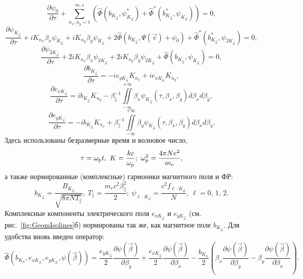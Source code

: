 \begin{equation}
\label{eq14_ch5}
    \dfrac{\partial \psi_0}{\partial \tau} 
    + \sum\limits^{m,s}_{n_x,n_y=1}\left( \hat \Phi(b_{K_{\vec{n}}},\psi_{K_{\vec{n}}}^*) 
    + \hat \Phi^*(b_{K_{\vec{n}}}^*,\psi_{K_{\vec{n}}}) \right)=0,
\end{equation}
\begin{equation}
    \dfrac{\partial \psi_{K_{\vec{n}}}}{\partial \tau}+iK_{n_x}\beta_x\psi_{K_{\vec{n}}}+iK_{n_y}\beta_y\psi_{K_{\vec{n}}}+2\hat \Phi(b_{K_{\vec{n}}},\Psi(\vec{v})+\psi_0)+\hat \Phi^*(b_{K_{\vec{n}}}^*,\psi_{2K_{\vec{n}}})=0,
\end{equation}
\begin{equation}
\label{eq16_ch5}
    \dfrac{\partial \psi_{2K_{\vec{n}}}}{\partial \tau}+2iK_{n_x}\beta_x\psi_{2K_{\vec{n}}}+2iK_{n_y}\beta_y\psi_{2K_{\vec{n}}}+\hat \Phi(b_{K_{\vec{n}}},\psi_{K_{\vec{n}}})=0,
\end{equation}
\begin{equation}
    \dfrac{\partial b_{K_{\vec{n}}}}{\partial \tau}=-ie_{y{K_{\vec{n}}}}K_{n_x}+ie_{x{K_{\vec{n}}}}K_{n_y},
\end{equation}
\begin{equation}
    \dfrac{\partial e_{x{K_{\vec{n}}}}}{\partial \tau}=ib_{K_{\vec{n}}}K_{n_y}-\beta_{\|}^{-1}\iint\limits^{+\infty}_{-\infty}\beta_x\psi_{K_{\vec{n}}}(\tau,\beta_x,\beta_y)d\beta_xd\beta_y,
\end{equation}
\begin{equation}
\label{eq19_ch5}
    \dfrac{\partial e_{y{K_{\vec{n}}}}}{\partial \tau}=-ib_{K_{\vec{n}}}K_{n_x}+\beta_{\|}^{-1}{\iint\limits^{+\infty}_{-\infty}\beta_y\psi_{K_{\vec{n}}}(\tau,\beta_x,\beta_y)d\beta_xd\beta_y} .
\end{equation}
Здесь использованы безразмерные время и волновое число, 
\begin{equation*}
    \tau=\wpl t, \
    K=\dfrac{kc}{\wpl}; \ 
    \wpl^2=\dfrac{4\pi Ne^2}{\me},
\end{equation*}
а также нормированные (комплексные) гармоники магнитного поля и ФР: 
\begin{equation}
\label{eq19plus1_ch5}
    b_{K_{\vec{n}}}=\dfrac{B_{K_{\vec{n}}}}{\sqrt{8\pi N T_{\|}}},\
    T_{\|}=\dfrac{m_ec^2\beta_{\|}^2}{2};\
    \psi_{\ell\cdot K_{\vec{n}}}=\dfrac{c^2f_{\ell\cdot K_{\vec{n}}}}{N},\ 
    \ell=0,\,1,\,2.  
\end{equation}
Комплексные компоненты электрического поля $e_{x{K_{\vec{n}}}}$ и $e_{y{K_{\vec{n}}}}$ (см. рис.~\ref{fig:GeomIsolines}б) нормированы так же, как магнитное поле $b_{K_{\vec{n}}}$. 
Для удобства вновь введен оператор:
\begin{equation}
\label{eq:operator_ch5}
    \hat \Phi(b_{K_n},e_{x{K_{\vec{n}}}},e_{y{K_{\vec{n}}}},\psi(\vec{\beta}))=\dfrac{e_{y{K_{\vec{n}}}}}{2}\dfrac{\partial \psi(\vec{\beta})}{\partial \beta_y}+\dfrac{e_{x{K_{\vec{n}}}}}{2}\dfrac{\partial \psi(\vec{\beta})}{\partial \beta_x}-\dfrac{b_{K_n}}{2} \left(\beta_x\dfrac{\partial \psi(\vec{\beta})}{\partial \beta_y}-\beta_y\dfrac{\partial \psi(\vec{\beta})}{\partial \beta_x}\right).
\end{equation}

